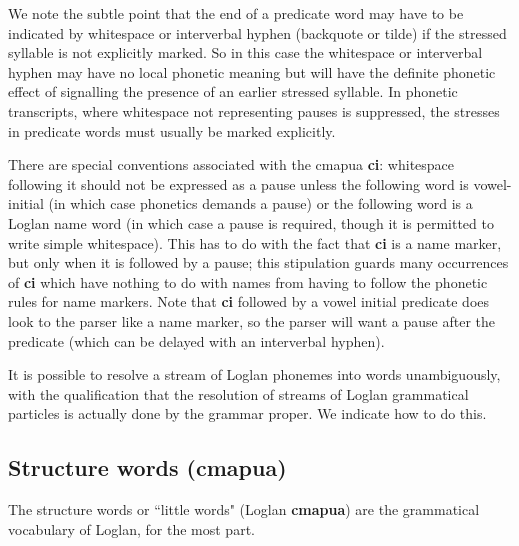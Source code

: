 \documentclass[12pt]{book}
\begin{document}
We note the subtle point that the end of a predicate word may have to be indicated by whitespace or interverbal hyphen (backquote or tilde)  if the stressed syllable is not explicitly marked.  So in this case the whitespace or interverbal hyphen may have no local phonetic meaning but will have the definite phonetic effect of signalling the presence of an earlier stressed syllable.  In phonetic transcripts, where whitespace not representing  pauses is suppressed, the stresses in predicate words must usually be marked explicitly.

There are special conventions associated with the cmapua {\bf ci}:  whitespace following it should not be expressed as a pause unless the following word is vowel-initial (in which case phonetics demands a pause) or the following word is a Loglan name word (in which case a pause is required, though it is permitted to write simple whitespace).  This has to do with the fact that {\bf ci} is a name marker, but only when it is followed by a pause; this stipulation guards many occurrences of {\bf ci} which have nothing to do with names from having to follow the phonetic rules for name markers.  Note that
{\bf ci} followed by a vowel initial predicate does look to the parser like a name marker, so the parser will want a pause after the predicate (which can be delayed with an interverbal hyphen).

It is possible to resolve a stream of Loglan phonemes into words unambiguously, with the qualification that the resolution of streams of Loglan grammatical particles is actually done by the grammar proper.  We indicate how to do this.

\subsection{Structure words (cmapua)}

The structure words or ``little words" (Loglan {\bf cmapua}) are the grammatical vocabulary of Loglan, for the most part.
\end{document}
